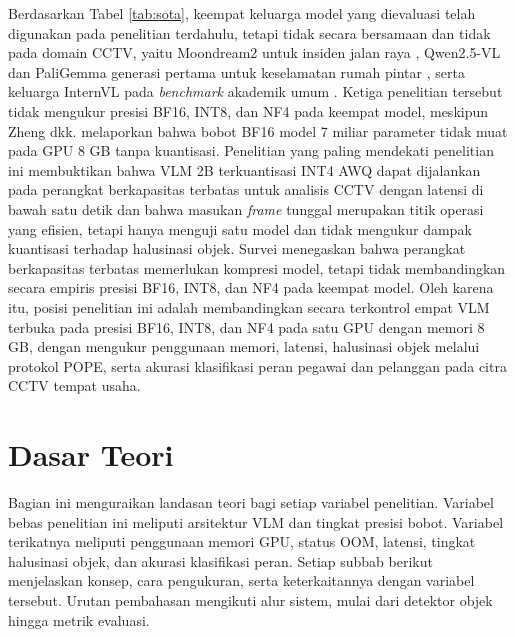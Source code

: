 Berdasarkan Tabel \ref{tab:sota}, keempat keluarga model yang dievaluasi telah digunakan pada penelitian terdahulu, tetapi tidak secara bersamaan dan tidak pada domain CCTV, yaitu Moondream2 untuk insiden jalan raya \cite{ref31}, Qwen2.5-VL dan PaliGemma generasi pertama untuk keselamatan rumah pintar \cite{ref32}, serta keluarga InternVL pada \textit{benchmark} akademik umum \cite{ref29}. Ketiga penelitian tersebut tidak mengukur presisi BF16, INT8, dan NF4 pada keempat model, meskipun Zheng dkk. \cite{ref32} melaporkan bahwa bobot BF16 model 7 miliar parameter tidak muat pada GPU 8 GB tanpa kuantisasi. Penelitian yang paling mendekati penelitian ini \cite{ref22} membuktikan bahwa VLM 2B terkuantisasi INT4 AWQ dapat dijalankan pada perangkat berkapasitas terbatas untuk analisis CCTV dengan latensi di bawah satu detik dan bahwa masukan \textit{frame} tunggal merupakan titik operasi yang efisien, tetapi hanya menguji satu model dan tidak mengukur dampak kuantisasi terhadap halusinasi objek. Survei \cite{ref14} menegaskan bahwa perangkat berkapasitas terbatas memerlukan kompresi model, tetapi tidak membandingkan secara empiris presisi BF16, INT8, dan NF4 pada keempat model. Oleh karena itu, posisi penelitian ini adalah membandingkan secara terkontrol empat VLM terbuka pada presisi BF16, INT8, dan NF4 pada satu GPU dengan memori 8 GB, dengan mengukur penggunaan memori, latensi, halusinasi objek melalui protokol POPE, serta akurasi klasifikasi peran pegawai dan pelanggan pada citra CCTV tempat usaha.

\section{Dasar Teori}
Bagian ini menguraikan landasan teori bagi setiap variabel penelitian. Variabel bebas penelitian ini meliputi arsitektur VLM dan tingkat presisi bobot. Variabel terikatnya meliputi penggunaan memori GPU, status OOM, latensi, tingkat halusinasi objek, dan akurasi klasifikasi peran. Setiap subbab berikut menjelaskan konsep, cara pengukuran, serta keterkaitannya dengan variabel tersebut. Urutan pembahasan mengikuti alur sistem, mulai dari detektor objek hingga metrik evaluasi.

